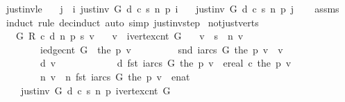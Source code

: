 \begin{isabellebody}
\endisatagproof
{\isafoldproof}%
%
\isadelimproof
\isanewline
%
\endisadelimproof
\isanewline
{}\isamarkupfalse%
\ just{\isacharunderscore}inv{\isacharunderscore}le{\isacharcolon}\isanewline
\ \ \ {\isachardoublequoteopen}j\ {\isasymle}\ i{\isachardoublequoteclose}\ {\isachardoublequoteopen}just{\isacharunderscore}inv\ G\ d\ c\ s\ n\ p\ i{\isachardoublequoteclose}\isanewline
\ \ \ {\isachardoublequoteopen}just{\isacharunderscore}inv\ G\ d\ c\ s\ n\ p\ j{\isachardoublequoteclose}\isanewline
%
\isadelimproof
\ \ %
\endisadelimproof
%
\isatagproof
{}\isamarkupfalse%
\ assms\ \isamarkupfalse%
\ {\isacharparenleft}induct\ rule{\isacharcolon}\ dec{\isacharunderscore}induct{\isacharparenright}\ {\isacharparenleft}auto\ simp{\isacharcolon}\ just{\isacharunderscore}inv{\isacharunderscore}step{\isacharparenright}%
\endisatagproof
{\isafoldproof}%
%
\isadelimproof
\isanewline
%
\endisadelimproof
\isanewline
{}\isamarkupfalse%
\ not{\isacharunderscore}just{\isacharunderscore}verts{\isacharcolon}\isanewline
\ \ \ G\ R\ c\ d\ n\ p\ s\ v\isanewline
\ \ \ {\isachardoublequoteopen}v\ {\isacharless}\ ivertex{\isacharunderscore}cnt\ G{\isachardoublequoteclose}\isanewline
\ \ \ {\isachardoublequoteopen}v\ {\isasymnoteq}\ s\ {\isasymand}\ n\ v\ {\isasymnoteq}\ {\isasyminfinity}\ {\isasymand}\isanewline
\ \ \ \ \ \ \ \ {\isacharparenleft}iedge{\isacharunderscore}cnt\ G\ {\isasymle}\ the\ {\isacharparenleft}p\ v{\isacharparenright}\ {\isasymor}\isanewline
\ \ \ \ \ \ \ \ snd\ {\isacharparenleft}iarcs\ G\ {\isacharparenleft}the\ {\isacharparenleft}p\ v{\isacharparenright}{\isacharparenright}{\isacharparenright}\ {\isasymnoteq}\ v\ {\isasymor}\ \isanewline
\ \ \ \ \ \ \ \ d\ v\ {\isasymnoteq}\ \isanewline
\ \ \ \ \ \ \ \ \ \ d\ {\isacharparenleft}fst\ {\isacharparenleft}iarcs\ G\ {\isacharparenleft}the\ {\isacharparenleft}p\ v{\isacharparenright}{\isacharparenright}{\isacharparenright}{\isacharparenright}\ {\isacharplus}\ ereal\ {\isacharparenleft}c\ {\isacharparenleft}the\ {\isacharparenleft}p\ v{\isacharparenright}{\isacharparenright}{\isacharparenright}\ {\isasymor}\ \isanewline
\ \ \ \ \ \ \ \ n\ v\ {\isasymnoteq}\ n\ {\isacharparenleft}fst\ {\isacharparenleft}iarcs\ G\ {\isacharparenleft}the\ {\isacharparenleft}p\ v{\isacharparenright}{\isacharparenright}{\isacharparenright}{\isacharparenright}\ {\isacharplus}\ enat\ {}{\isacharparenright}{\isachardoublequoteclose}\isanewline
\ \ \ {\isachardoublequoteopen}{\isasymnot}\ just{\isacharunderscore}inv\ G\ d\ c\ s\ n\ p\ {\isacharparenleft}ivertex{\isacharunderscore}cnt\ G{\isacharparenright}{\isachardoublequoteclose}\isanewline

\end{isabellebody}
